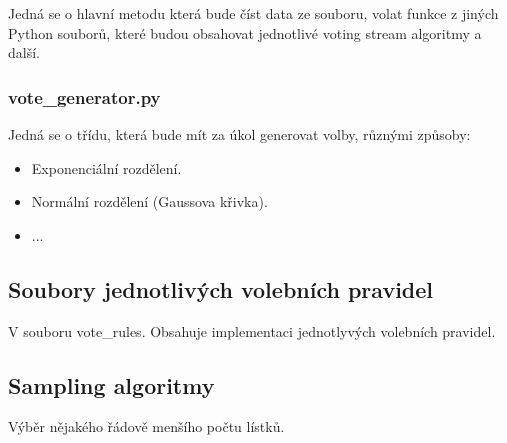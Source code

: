 \documentclass[a4paper,12pt]{report}
\begin{document}
	Jedná se o hlavní metodu která bude číst data ze souboru, volat funkce z jiných Python souborů, které budou obsahovat jednotlivé voting stream algoritmy a další.
	
	\subsubsection{vote\_generator.py}
	
	Jedná se o třídu, která bude mít za úkol generovat volby, různými způsoby:
	
	\begin{itemize}
		\item Exponenciální rozdělení.
		\item Normální rozdělení (Gaussova křivka).
		\item ...
	\end{itemize}
	
	\subsection{Soubory jednotlivých volebních pravidel}
	
	V souboru vote\_rules. Obsahuje implementaci jednotlyvých volebních pravidel.
	
	\subsection{Sampling algoritmy}
	
	Výběr nějakého řádově menšího počtu lístků.
	
	
	
	
	
	
	
	
	
	
	
	
\end{document}
